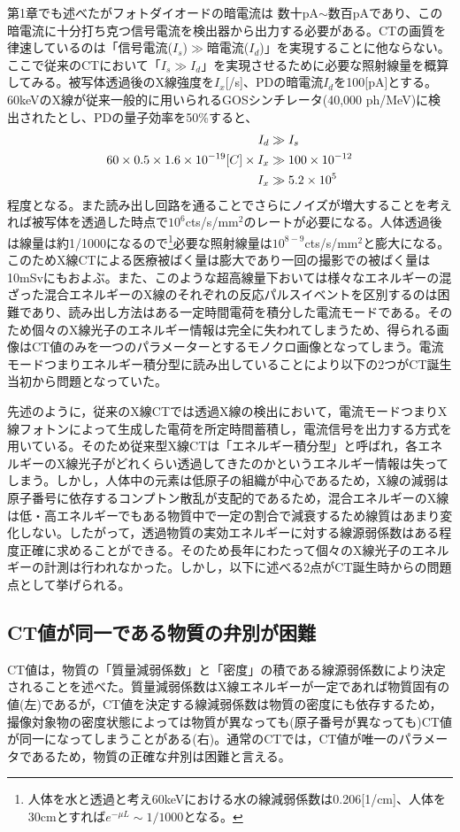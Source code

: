 第1章でも述べたがフォトダイオードの暗電流は 数十pA$\sim$数百pAであり、この暗電流に十分打ち克つ信号電流を検出器から出力する必要がある。CTの画質を律速しているのは「信号電流($I_s$)$\gg$暗電流($I_d$)」を実現することに他ならない。ここで従来のCTにおいて「$I_s\gg I_d$」を実現させるために必要な照射線量を概算してみる。被写体透過後のX線強度を$I_x$[/s]、PDの暗電流$I_d$を100[pA]とする。60keVのX線が従来一般的に用いられるGOSシンチレータ(40,000 ph/MeV)に検出されたとし、PDの量子効率を50\%すると、
\begin{align}
I_d&\gg I_s\\
60\time40\times0.5\times1.6\times10^{-19} [C] \times I_x&\gg100\times10^{-12}\\
I_x&\gg 5.2\times10^5
\end{align}
程度となる。また読み出し回路を通ることでさらにノイズが増大することを考えれば被写体を透過した時点で$10^{6}$cts/s/mm$^2$のレートが必要になる。人体透過後は線量は約1/1000になるので\footnote{人体を水と透過と考え60keVにおける水の線減弱係数は0.206[1/cm]、人体を30cmとすれば$e^{-\mu L}\sim1/1000$となる。}必要な照射線量は$10^{8-9}$cts/s/mm$^2$と膨大になる。このためX線CTによる医療被ばく量は膨大であり一回の撮影での被ばく量は10mSvにもおよぶ。また、このような超高線量下おいては様々なエネルギーの混ざった混合エネルギーのX線のそれぞれの反応パルスイベントを区別するのは困難であり、読み出し方法はある一定時間電荷を積分した電流モードである。そのため個々のX線光子のエネルギー情報は完全に失われてしまうため、得られる画像はCT値のみを一つのパラメーターとするモノクロ画像となってしまう。電流モードつまりエネルギー積分型に読み出していることにより以下の2つがCT誕生当初から問題となっていた。


先述のように，従来のX線CTでは透過X線の検出において，電流モードつまりX線フォトンによって生成した電荷を所定時間蓄積し，電流信号を出力する方式を用いている。そのため従来型X線CTは「エネルギー積分型」と呼ばれ，各エネルギーのX線光子がどれくらい透過してきたのかというエネルギー情報は失ってしまう。しかし，人体中の元素は低原子の組織が中心であるため，X線の減弱は原子番号に依存するコンプトン散乱が支配的であるため，混合エネルギーのX線は低・高エネルギーでもある物質中で一定の割合で減衰するため線質はあまり変化しない。したがって，透過物質の実効エネルギーに対する線源弱係数はある程度正確に求めることができる。そのため長年にわたって個々のX線光子のエネルギーの計測は行われなかった。しかし，以下に述べる2点がCT誕生時からの問題点として挙げられる。
\fi

\subsection{CT値が同一である物質の弁別が困難}
CT値は，物質の「質量減弱係数」と「密度」の積である線源弱係数により決定されることを述べた。質量減弱係数はX線エネルギーが一定であれば物質固有の値(左)であるが，CT値を決定する線減弱係数は物質の密度にも依存するため，撮像対象物の密度状態によっては物質が異なっても(原子番号が異なっても)CT値が同一になってしまうことがある(右)。通常のCTでは，CT値が唯一のパラメータであるため，物質の正確な弁別は困難と言える。

